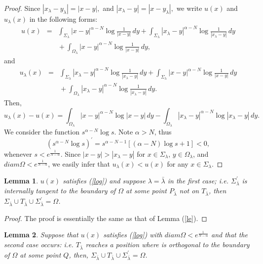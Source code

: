 \documentclass[12pt]{amsproc}
\theoremstyle{plain}
\numberwithin{equation}{section}
\newtheorem{lem}{Lemma}[section]
\begin{document}
\begin{proof}

Since $|x_\lambda-y_\lambda|=|x-y|,$ and
$|x_\lambda-y|=|x-y_\lambda|,$ we write $u(x)$ and $u_\lambda(x)$ in
the following forms:
\begin{eqnarray*}
u(x)&=&
\int_{\Sigma_\lambda}|x-y|^{\alpha-N}\log\frac{1}{|x-y|}\,dy+\int_{\Sigma_\lambda}|x_\lambda-y|^{\alpha-N}\log\frac{1}{|x_\lambda-y|}\,dy
\\ &&{}+ \int_{\Omega_\lambda}|x-y|^{\alpha-N}\log\frac{1}{|x-y|}\,dy,
\end{eqnarray*}
and
\begin{eqnarray*}
u_\lambda(x)&=&\int_{\Sigma_\lambda}|x_\lambda-y|^{\alpha-N}\log\frac{1}{|x_\lambda-y|}\,dy+\int_{\Sigma_\lambda}|x-y|^{\alpha-N}\log\frac{1}{|x-y|}\,dy
\\ &&{}+
\int_{\Omega_\lambda}|x_\lambda-y|^{\alpha-N}\log\frac{1}{|x_\lambda-y|}\,dy.
\end{eqnarray*}
Then,
\begin{equation}
u_\lambda(x)-u(x)=\int_{\Omega_\lambda}|x-y|^{\alpha-N}\log|x-y|\,dy-\int_{\Omega_\lambda}|x_\lambda-y|^{\alpha-N}\log|x_\lambda-y|\,dy.
\label{pw}
\end{equation}
 We consider the function $s^{\alpha-N}\log s.$ Note $\alpha>N$, thus
$$(s^{\alpha-N}\log s)^\prime=s^{\alpha-N-1}[(\alpha-N)\log s+1]<0,$$
whenever $s<e^{\frac{1}{N-\alpha}}.$ Since $|x-y|>|x_\lambda-y|$ for
$x\in \Sigma_\lambda , \, y\in \Omega_\lambda$, and  $diam \Omega<
e^{\frac{1}{N-\alpha}}$, we easily infer that $u_\lambda(x)<u(x)$
for any $x\in\Sigma_\lambda.$

\end{proof}

\begin{lem}
$u(x)$ satisfies (\ref{log}) and suppose $\lambda=\bar\lambda$ in
the first case; i.e. $\Sigma^\prime_{\bar\lambda}$ is internally
tangent to the boundary of $\Omega$ at some point $P_{\bar\lambda}$
not on $T_{\bar\lambda}$, then $\Sigma_{\bar\lambda}\cup
T_{\bar\lambda}\cup\Sigma^\prime_{\bar\lambda}=\Omega$.
\end{lem}
\begin{proof}

The proof is essentially the same as that of Lemma (\ref{le}).

\end{proof}

\begin{lem}
Suppose that $u(x)$ satisfies (\ref{log}) with $diam \Omega<
e^{\frac{1}{N-\alpha}}$ and  that the second case occurs: i.e.
$T_{\bar\lambda}$ reaches a position where is orthogonal to the
boundary of $\Omega$ at some point $Q$, then,
$\Sigma_{\bar\lambda}\cup
T_{\bar\lambda}\cup\Sigma^\prime_{\bar\lambda}=\Omega$.
\end{lem}
\end{document}
